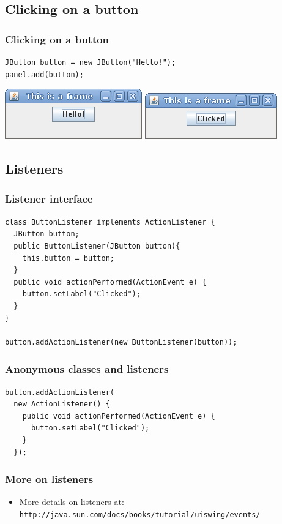 \documentclass[10pt, handout]{beamer}
\begin{document}
\subsection{Clicking on a button}
\begin{frame}[fragile]
  \frametitle{Clicking on a button}
\begin{verbatim}
JButton button = new JButton("Hello!");
panel.add(button);
\end{verbatim}
\begin{center}
  \includegraphics[width=0.38\linewidth]{beforeClick}
  \includegraphics[width=0.4\linewidth]{afterClick}
\end{center}
\end{frame}

\subsection{Listeners}
\begin{frame}[fragile]
  \frametitle{Listener interface}
\begin{verbatim}
class ButtonListener implements ActionListener {
  JButton button;
  public ButtonListener(JButton button){
    this.button = button;
  }
  public void actionPerformed(ActionEvent e) {
    button.setLabel("Clicked");
  }
}

button.addActionListener(new ButtonListener(button));
\end{verbatim}
\end{frame}

\begin{frame}[fragile]
  \frametitle{Anonymous classes and listeners}
\begin{verbatim}
button.addActionListener(
  new ActionListener() {
    public void actionPerformed(ActionEvent e) {
      button.setLabel("Clicked");
    }
  });
\end{verbatim}
\end{frame}

\begin{frame}
  \frametitle{More on listeners}
  \begin{itemize}
    \item More details on listeners at:
      \verb!http://java.sun.com/docs/books/tutorial/uiswing/events/!
  \end{itemize}
\end{frame}
\end{document}
